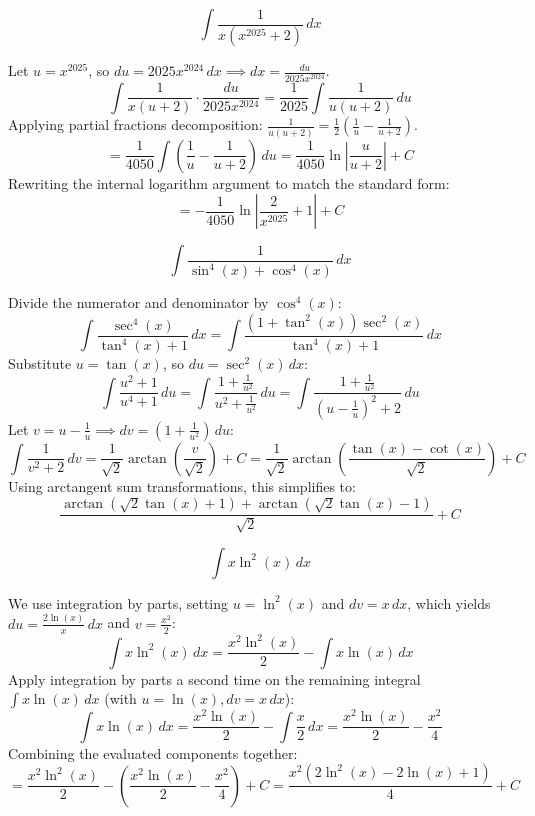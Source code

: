 \begin{questions}
    \question 
    \[ \int \frac{1}{x(x^{2025}+2)} \, dx \]
    \begin{solution}
        Let $u = x^{2025}$, so $du = 2025x^{2024} \, dx \implies dx = \frac{du}{2025x^{2024}}$.
        \[ \int \frac{1}{x(u+2)} \cdot \frac{du}{2025x^{2024}} = \frac{1}{2025}\int \frac{1}{u(u+2)} \, du \]
        Applying partial fractions decomposition: $\frac{1}{u(u+2)} = \frac{1}{2}\left(\frac{1}{u} - \frac{1}{u+2}\right)$.
        \[ = \frac{1}{4050}\int \left(\frac{1}{u} - \frac{1}{u+2}\right) \, du = \frac{1}{4050}\ln\left|\frac{u}{u+2}\right| + C \]
        Rewriting the internal logarithm argument to match the standard form:
        \[ = -\frac{1}{4050}\ln\left|\frac{2}{x^{2025}}+1\right| + C \]
    \end{solution}

    \question 
    \[ \int \frac{1}{\sin^{4}(x)+\cos^{4}(x)} \, dx \]
    \begin{solution}
        Divide the numerator and denominator by $\cos^4(x)$:
        \[ \int \frac{\sec^4(x)}{\tan^4(x)+1} \, dx = \int \frac{(1+\tan^2(x))\sec^2(x)}{\tan^4(x)+1} \, dx \]
        Substitute $u = \tan(x)$, so $du = \sec^2(x) \, dx$:
        \[ \int \frac{u^2+1}{u^4+1} \, du = \int \frac{1+\frac{1}{u^2}}{u^2+\frac{1}{u^2}} \, du = \int \frac{1+\frac{1}{u^2}}{\left(u-\frac{1}{u}\right)^2+2} \, du \]
        Let $v = u - \frac{1}{u} \implies dv = (1+\frac{1}{u^2}) \, du$:
        \[ \int \frac{1}{v^2+2} \, dv = \frac{1}{\sqrt{2}}\arctan\left(\frac{v}{\sqrt{2}}\right) + C = \frac{1}{\sqrt{2}}\arctan\left(\frac{\tan(x)-\cot(x)}{\sqrt{2}}\right) + C \]
        Using arctangent sum transformations, this simplifies to:
        \[ \frac{\arctan\left(\sqrt{2}\tan(x)+1\right)+\arctan\left(\sqrt{2}\tan(x)-1\right)}{\sqrt{2}} + C \]
    \end{solution}

    \question 
    \[ \int x\ln^{2}(x) \, dx \]
    \begin{solution}
        We use integration by parts, setting $u = \ln^2(x)$ and $dv = x \, dx$, which yields $du = \frac{2\ln(x)}{x} \, dx$ and $v = \frac{x^2}{2}$:
        \[ \int x\ln^2(x) \, dx = \frac{x^2\ln^2(x)}{2} - \int x\ln(x) \, dx \]
        Apply integration by parts a second time on the remaining integral $\int x\ln(x) \, dx$ (with $u=\ln(x), dv=x \, dx$):
        \[ \int x\ln(x) \, dx = \frac{x^2\ln(x)}{2} - \int \frac{x}{2} \, dx = \frac{x^2\ln(x)}{2} - \frac{x^2}{4} \]
        Combining the evaluated components together:
        \[ = \frac{x^2\ln^2(x)}{2} - \left( \frac{x^2\ln(x)}{2} - \frac{x^2}{4} \right) + C = \frac{x^{2}\left(2\ln^{2}(x)-2\ln(x)+1\right)}{4} + C \]
    \end{solution}


\end{questions}
